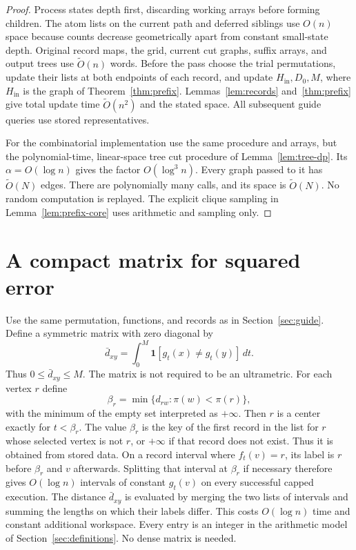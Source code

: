\documentclass[11pt]{article}
\theoremstyle{definition}
\newcommand{\ind}{\mathbf 1}
\newcommand{\wt}{\widetilde}
\begin{document}
\begin{proof}
Process states depth first, discarding working arrays before forming
children. The atom lists on the current path and deferred siblings use
$O(n)$ space because counts decrease geometrically apart from constant
small-state depth. Original record maps, the grid, current cut graphs,
suffix arrays, and output trees use $\wt O(n)$ words.
Before the pass choose the trial permutations, update their lists at
both endpoints of each record, and update $H_{\mathrm{in}},D_0,M$,
where $H_{\mathrm{in}}$ is the graph of Theorem~\ref{thm:prefix}.
Lemmas~\ref{lem:records} and~\ref{thm:prefix} give total update time
$\wt O(n^2)$ and the stated space. All subsequent guide queries use
stored representatives.

For the combinatorial implementation use the same procedure and arrays,
but the polynomial-time, linear-space tree cut procedure of
Lemma~\ref{lem:tree-dp}. Its $\alpha=O(\log n)$ gives the factor
$O(\log^3 n)$. Every graph passed to it has $\wt O(N)$ edges.
There are polynomially many calls, and its space is $\wt O(N)$.
No random computation is replayed. The explicit clique sampling in
Lemma~\ref{lem:prefix-core} uses arithmetic and sampling only.
\end{proof}


\section{A compact matrix for squared error}
\label{sec:l2-input}

Use the same permutation, functions, and records as in
Section~\ref{sec:guide}. Define a symmetric matrix with zero diagonal by
\begin{equation}\label{eq:bar-matrix}
 \bar d_{xy}=\int_0^M\ind[g_t(x)\ne g_t(y)]\,dt.
\end{equation}
Thus $0\le\bar d_{xy}\le M$. The matrix is not required to be an
ultrametric. For each vertex $r$ define
\[
 \beta_r=\min\{d_{rw}:\pi(w)<\pi(r)\},
\]
with the minimum of the empty set interpreted as $+\infty$.
Then $r$ is a center exactly for $t<\beta_r$. The value $\beta_r$ is
the key of the first record in the list for $r$ whose selected vertex
is not $r$, or $+\infty$ if that record does not exist. Thus it is
obtained from stored data.
On a record interval where $f_t(v)=r$, its label is $r$ before $\beta_r$
and $v$ afterwards. Splitting that interval at $\beta_r$ if necessary
therefore gives $O(\log n)$ intervals of constant $g_t(v)$ on every
successful capped execution. The distance $\bar d_{xy}$ is evaluated
by merging the two lists of intervals and summing the lengths on which
their labels differ. This costs $O(\log n)$ time and constant additional
workspace. Every entry is an integer in the arithmetic model of
Section~\ref{sec:definitions}. No dense matrix is needed.
\end{document}
